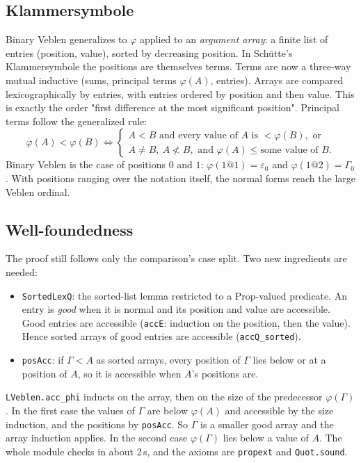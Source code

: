 \documentclass[11pt]{article}
\theoremstyle{definition}
\theoremstyle{remark}
\newcommand{\lean}[1]{\texttt{#1}}
\begin{document}
\subsection{Klammersymbole}
Binary Veblen generalizes to $\varphi$ applied to an \emph{argument array}: a
finite list of entries (position, value), sorted by decreasing position. In
Schütte's Klammersymbole the positions are themselves terms. Terms are now a
three-way mutual inductive (sums, principal terms $\varphi(A)$, entries).
Arrays are compared lexicographically by entries, with entries ordered by
position and then value. This is exactly the order "first difference at the
most significant position". Principal terms follow the generalized rule:
\[
\varphi(A)<\varphi(B)\iff
\begin{cases}
A<B \text{ and every value of } A \text{ is } <\varphi(B), \text{ or}\\
A\ne B,\ A\not<B, \text{ and } \varphi(A)\le \text{some value of } B.
\end{cases}
\]
Binary Veblen is the case of positions $0$ and $1$: $\varphi(1@1)=\varepsilon_0$
and $\varphi(1@2)=\Gamma_0$. With positions ranging over the notation itself,
the normal forms reach the large Veblen ordinal.

\subsection{Well-foundedness}
The proof still follows only the comparison's case split. Two new ingredients
are needed:
\begin{itemize}
\item \lean{SortedLexQ}: the sorted-list lemma restricted to a Prop-valued
  predicate. An entry is \emph{good} when it is normal and its position and
  value are accessible. Good entries are accessible (\lean{accE}: induction on
  the position, then the value). Hence sorted arrays of good entries are
  accessible (\lean{accQ\_sorted}).
\item \lean{posAcc}: if $\Gamma<A$ as sorted arrays, every position of
  $\Gamma$ lies below or at a position of $A$, so it is accessible when
  $A$'s positions are.
\end{itemize}
\lean{LVeblen.acc\_phi} inducts on the array, then on the size of the
predecessor $\varphi(\Gamma)$. In the first case the values of $\Gamma$ are
below $\varphi(A)$ and accessible by the size induction, and the positions by
\lean{posAcc}. So $\Gamma$ is a smaller good array and the array induction
applies. In the second case $\varphi(\Gamma)$ lies below a value of $A$. The
whole module checks in about 2\,s, and the axioms are \lean{propext} and
\lean{Quot.sound}.
\end{document}
